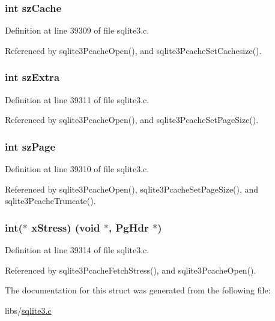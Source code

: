 \subsubsection[{sz\+Cache}]{\setlength{\rightskip}{0pt plus 5cm}int sz\+Cache}\label{struct_p_cache_ac2525b85a8b6f4c5396ebe335e544cde}


Definition at line 39309 of file sqlite3.\+c.



Referenced by sqlite3\+Pcache\+Open(), and sqlite3\+Pcache\+Set\+Cachesize().

\hypertarget{struct_p_cache_aa6d33a46ecc20cbe1700c74a12b4fb14}{}
\subsubsection[{sz\+Extra}]{\setlength{\rightskip}{0pt plus 5cm}int sz\+Extra}\label{struct_p_cache_aa6d33a46ecc20cbe1700c74a12b4fb14}


Definition at line 39311 of file sqlite3.\+c.



Referenced by sqlite3\+Pcache\+Open(), and sqlite3\+Pcache\+Set\+Page\+Size().

\hypertarget{struct_p_cache_a0ead96b04a1cc6dc6ec781782e82d052}{}
\subsubsection[{sz\+Page}]{\setlength{\rightskip}{0pt plus 5cm}int sz\+Page}\label{struct_p_cache_a0ead96b04a1cc6dc6ec781782e82d052}


Definition at line 39310 of file sqlite3.\+c.



Referenced by sqlite3\+Pcache\+Open(), sqlite3\+Pcache\+Set\+Page\+Size(), and sqlite3\+Pcache\+Truncate().

\hypertarget{struct_p_cache_a7c60f9329f358d9c9bad04ca5e279225}{}
\subsubsection[{x\+Stress}]{\setlength{\rightskip}{0pt plus 5cm}int($\ast$ x\+Stress) (void $\ast$, {\bf Pg\+Hdr} $\ast$)}\label{struct_p_cache_a7c60f9329f358d9c9bad04ca5e279225}


Definition at line 39314 of file sqlite3.\+c.



Referenced by sqlite3\+Pcache\+Fetch\+Stress(), and sqlite3\+Pcache\+Open().



The documentation for this struct was generated from the following file\+:\begin{DoxyCompactItemize}
\item 
libs/\hyperlink{sqlite3_8c}{sqlite3.\+c}\end{DoxyCompactItemize}
